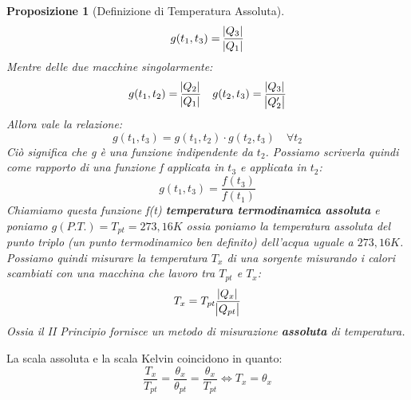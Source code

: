 \documentclass{article}
\newtheorem{prop}[defn]{Proposizione}
\newcommand{\note}{\noindent {\quad \bf \underline{Osservazione:}} \quad}
\begin{document}
\begin{prop}[Definizione di Temperatura Assoluta]
\[g(t_1,t_3)=\frac{\abs{Q_3}}{\abs{Q_1}}\]
Mentre delle due macchine singolarmente:
\[g(t_1,t_2)=\frac{\abs{Q_2}}{\abs{Q_1}}\quad g(t_2,t_3)=\frac{\abs{Q_3}}{\abs{Q_2'}}\]
Allora vale la relazione:
\[g(t_1,t_3)=g(t_1,t_2)\cdot g(t_2,t_3)\quad\forall t_2\]
Ciò significa che g è una funzione indipendente da $t_2$. Possiamo scriverla quindi come rapporto di una funzione f applicata in $t_3$ e applicata in $t_2$:
\[g(t_1,t_3)=\frac{f(t_3)}{f(t_1)}\]
Chiamiamo questa funzione f(t) \textbf{temperatura termodinamica assoluta} e poniamo $g(P.T.)=T_{pt}=273,16K$ ossia poniamo la temperatura assoluta del punto triplo (un punto termodinamico ben definito) dell'acqua uguale a $273,16K$. Possiamo quindi misurare la temperatura $T_x$ di una sorgente misurando i calori scambiati con una macchina che lavoro tra $T_{pt}$ e $T_x$:
\[T_x=T_{pt}\frac{\abs{Q_x}}{\abs{Q_{pt}}}\]
Ossia il II Principio fornisce un metodo di misurazione \textbf{assoluta} di temperatura.
\end{prop}
\note La scala assoluta e la scala Kelvin coincidono in quanto:
\[\frac{T_x}{T_{pt}}=\frac{\theta_x}{\theta_{pt}}=\frac{\theta_x}{T_{pt}}\iff T_x=\theta_x\]
\end{document}
